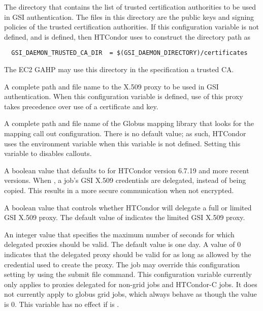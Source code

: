 \begin{description}
\label{param:GSIDaemonTrustedCADir}
\item[\Macro{GSI\_DAEMON\_TRUSTED\_CA\_DIR}]
  The directory that contains the
  list of trusted certification authorities to be used in GSI authentication.
  The files in this directory are the public keys and signing policies
  of the trusted certification authorities.
  If this configuration variable is not defined, and
   is defined, then HTCondor uses
   to construct the directory path as
  \begin{verbatim}
  GSI_DAEMON_TRUSTED_CA_DIR  = $(GSI_DAEMON_DIRECTORY)/certificates
  \end{verbatim}
  The EC2 GAHP may use this directory in the specification a trusted CA.

\label{param:GSIDaemonProxy}
\item[\Macro{GSI\_DAEMON\_PROXY}]
  A complete path and file name to the
  X.509 proxy to be used in GSI authentication.
  When this configuration variable is defined, use of this proxy
  takes precedence over use of a certificate and key.

\label{param:GSIAuthzConf}
\item[\Macro{GSI\_AUTHZ\_CONF}]
  A complete path and file name of the
  Globus mapping library that looks for the mapping call out configuration.
  There is no default value; as such, HTCondor uses the environment
  variable  when this variable is not defined.
  Setting this variable to  disables callouts.

\label{param:DelegateJobGSICredentials} 
\item[\Macro{DELEGATE\_JOB\_GSI\_CREDENTIALS}]
  A boolean value that defaults to  for HTCondor version 6.7.19
  and more recent versions.
  When , a job's GSI X.509 credentials are delegated,
  instead of being copied.
  This results in a more secure communication when not encrypted.

\label{param:DelegateFullJobGSICredentials} 
\item[\Macro{DELEGATE\_FULL\_JOB\_GSI\_CREDENTIALS}]
  A boolean value that controls whether HTCondor will delegate a full or limited
  GSI X.509 proxy.  
  The default value of  indicates the limited GSI X.509 proxy.

\label{param:DelegateJobGSICredentialsLifetime}
\item[\Macro{DELEGATE\_JOB\_GSI\_CREDENTIALS\_LIFETIME}]
  An integer value that specifies the maximum number of seconds for
  which delegated proxies should be valid.  
  The default value is one day.
  A value of 0 indicates that the delegated proxy should be valid for as
  long as allowed by the credential used to create the proxy.  
  The job may override this configuration setting by using the
   submit file
  command.  This configuration variable currently only applies to
  proxies delegated for non-grid jobs and HTCondor-C jobs.  It does not
  currently apply to globus grid jobs, which always behave as though
  the value is 0.
  This variable has no effect if 
  is .


\end{description}
